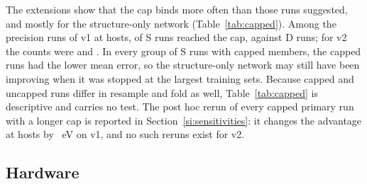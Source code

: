 The extensions show that the cap binds more often than those runs suggested, and mostly for the structure-only
network (Table~\ref{tab:capped}). Among the precision runs of v1 at \numCfgBudgetsHostsItemSix{} hosts,
\numPrecisionABFourHundredBSixHundredFiftyFourDescriptiveCappedPrecisionSixHundredFiftyFourVOneSNCapped{} of
\numPrecisionABFourHundredBSixHundredFiftyFourDescriptiveCappedPrecisionSixHundredFiftyFourVOneSNRuns{} S runs
reached the cap, against
\numPrecisionABFourHundredBSixHundredFiftyFourDescriptiveCappedPrecisionSixHundredFiftyFourVOneDNCapped{} D runs;
for v2 the counts were
\numPrecisionABFourHundredBSixHundredFiftyFourDescriptiveCappedPrecisionSixHundredFiftyFourVTwoSNCapped{} and
\numPrecisionABFourHundredBSixHundredFiftyFourDescriptiveCappedPrecisionSixHundredFiftyFourVTwoDNCapped{}. In every
group of S runs with capped members, the capped runs had the lower mean error, so the structure-only network may
still have been improving when it was stopped at the largest training sets. Because capped and uncapped runs differ
in resample and fold as well, Table~\ref{tab:capped} is descriptive and carries no test. The post hoc rerun of every
capped primary run with a longer cap is reported in Section~\ref{si:sensitivities}: it changes the advantage at
\numCfgBudgetsHostsItemSix{} hosts by
\numSensCappedPostHocPerBudgetSixHundredFiftyFourChangeTwinMinusPrimaryAMean{}~eV on v1, and no such reruns exist
for v2.

\begin{table}[htbp]
\caption{Runs that stopped at the cap of \numCfgTrainingMaxEpochs{} passes (extension, descriptive, no test), and
the mean single-run site MAE (eV) of capped and uncapped runs. Precision: the pooled runs at the two largest
budgets; grouped CV: all folds at each $K$. Records: \recprecision{} and \reccv{}, key
\texttt{payload.descriptive.capped}.}
\label{tab:capped}
\centering\scriptsize

\end{table}

\subsection{Hardware}

